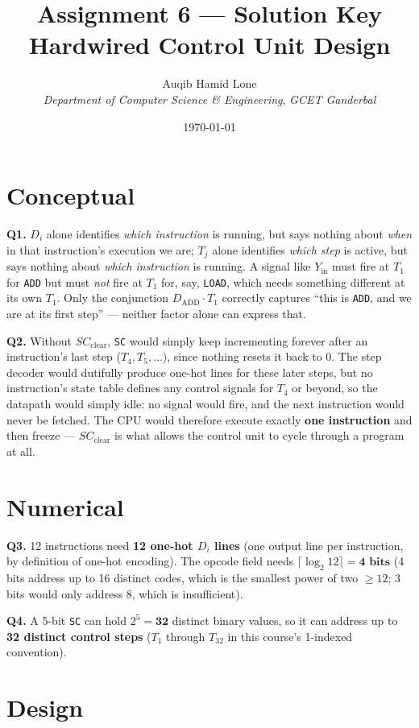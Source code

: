 \documentclass[11pt]{article}
\title{Assignment 6 --- Solution Key\\\large Hardwired Control Unit Design}
\author{Auqib Hamid Lone\\[0.3em]
  \emph{Department of Computer Science \& Engineering}, \emph{GCET Ganderbal}}
\date{\today}
\begin{document}
\maketitle

\section{Conceptual}

\textbf{Q1.} $D_i$ alone identifies \emph{which instruction} is running, but says nothing about \emph{when} in that instruction's execution we are; $T_j$ alone identifies \emph{which step} is active, but says nothing about \emph{which instruction} is running. A signal like $Y_{\text{in}}$ must fire at $T_1$ for \texttt{ADD} but must \emph{not} fire at $T_1$ for, say, \texttt{LOAD}, which needs something different at its own $T_1$. Only the conjunction $D_{\text{ADD}} \cdot T_1$ correctly captures ``this is \texttt{ADD}, and we are at its first step'' --- neither factor alone can express that.

\textbf{Q2.} Without $SC_{\text{clear}}$, \texttt{SC} would simply keep incrementing forever after an instruction's last step ($T_4, T_5, \dots$), since nothing resets it back to 0. The step decoder would dutifully produce one-hot lines for these later steps, but no instruction's state table defines any control signals for $T_4$ or beyond, so the datapath would simply idle: no signal would fire, and the next instruction would never be fetched. The CPU would therefore execute exactly \textbf{one instruction} and then freeze --- $SC_{\text{clear}}$ is what allows the control unit to cycle through a program at all.

\section{Numerical}

\textbf{Q3.} 12 instructions need \textbf{12 one-hot $D_i$ lines} (one output line per instruction, by definition of one-hot encoding). The opcode field needs $\lceil \log_2 12 \rceil = \textbf{4 bits}$ (4 bits address up to 16 distinct codes, which is the smallest power of two $\geq 12$; 3 bits would only address 8, which is insufficient).

\textbf{Q4.} A 5-bit \texttt{SC} can hold $2^5 = \textbf{32}$ distinct binary values, so it can address up to \textbf{32 distinct control steps} ($T_1$ through $T_{32}$ in this course's 1-indexed convention).

\section{Design}
\end{document}

